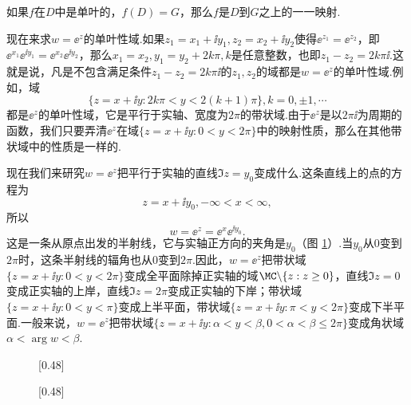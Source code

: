 如果$f$在$D$中是单叶的，$f(D)=G$，那么$f$是$D$到$G$之上的一一映射.

现在来求$w=\ee^z$的单叶性域.如果$z_1=x_1+\ii y_1,z_2=x_2+\ii y_2$使得$\ee^{z_1}=\ee^{z_2} $，即$\ee^{x_1}\ee^{\ii y_1}=\ee^{x_2}\ee^{\ii y_2}$，那么$x_1=x_2,y_1=y_2+2k\pi,k$是任意整数，也即$z_1-z_2=2k\pi\ii$.这就是说，凡是不包含满足条件$z_1-z_2=2k\pi\ii$的$z_1,z_2$的域都是$w=\ee^z$的单叶性域.例如，域
\[\{z=x+\ii y:2k\pi<y<2(k+1)\pi\},k=0,\pm1,\cdots\]
都是$\ee^z$的单叶性域，它是平行于实轴、宽度为$2\pi$的带状域.由于$\ee^z$是以$2\pi\ii$为周期的函数，我们只要弄清$\ee^z$在域$\{z=x+\ii y:0<y<2\pi\}$中的映射性质，那么在其他带状域中的性质是一样的.

现在我们来研究$w=\ee^z$把平行于实轴的直线$\Im z=y_0$变成什么.这条直线上的点的方程为
\[z=x+\ii y_0,-\infty<x<\infty,\]
所以
\[w=\ee^z=\ee^x\ee^{\ii y_0}.\]
这是一条从原点出发的半射线，它与实轴正方向的夹角是$y_0$（图 \ref{fig2.4}）.当$y_0$从$0$变到$2\pi$时，这条半射线的辐角也从$0$变到$2\pi$.因此，$w=\ee^z$把带状域$\{z=x+\ii y:0<y<2\pi\}$变成全平面除掉正实轴的域$\MC\backslash\{z:z\ge0\}$，直线$\Im z=0$变成正实轴的上岸，直线$\Im z=2\pi$变成正实轴的下岸；带状域$\{z=x+\ii y:0<y<\pi\}$变成上半平面，带状域$\{z=x+\ii y:\pi<y<2\pi\}$变成下半平面.一般来说，$w=\ee^z$把带状域$\{z=x+\ii y:\alpha<y<\beta,0<\alpha<\beta\le2\pi\}$变成角状域$\alpha<\arg w<\beta$.
\begin{figure}[!ht]
\centering
\subcaptionbox{\label{fig2.4a}}[0.48\textwidth]
{
}
\subcaptionbox{\label{fig2.4b}}[0.48\textwidth]
{
}
\caption{\label{fig2.4}}
\end{figure}
